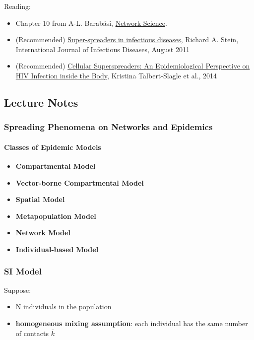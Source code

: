 \documentclass[11pt]{scrartcl} %
\begin{document}
Reading:
\begin{itemize}
	\item Chapter 10 from A-L. Barabási, \href{http://networksciencebook.com/}{Network Science}.
	\item (Recommended) \href{https://doi.org/10.1016/j.ijid.2010.06.020}{Super-spreaders in infectious diseases}, Richard A. Stein, International Journal of Infectious Diseases, August 2011
	\item (Recommended) \href{https://doi.org/10.1371/journal.ppat.1004092\%C2\%A0}{Cellular Superspreaders: An Epidemiological Perspective on HIV Infection inside the Body}, Kristina Talbert-Slagle et al., 2014
\end{itemize}

\subsection{Lecture Notes}

\subsubsection{Spreading Phenomena on Networks and Epidemics}
\paragraph{Classes of Epidemic Models}
\begin{itemize}
	\item \textbf{Compartmental Model}
	\item \textbf{Vector-borne Compartmental Model}
	\item \textbf{Spatial Model}
	\item \textbf{Metapopulation Model}
	\item \textbf{Network Model}
	\item \textbf{Individual-based Model}
\end{itemize}

\subsubsection{SI Model}
Suppose:
\begin{itemize}
	\item N individuals in the population
	\item \textbf{homogeneous mixing assumption}: each individual has the same number of contacts $\bar{k}$
\end{itemize}
\end{document}

